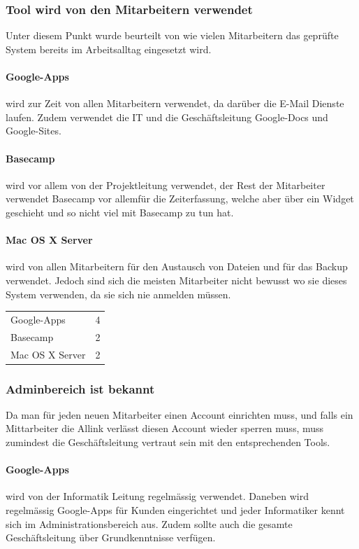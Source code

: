 \subsubsection{Tool wird von den Mitarbeitern verwendet}
\label{ssub:Tool wird von den Mitarbeitern verwendet}
Unter diesem Punkt wurde beurteilt von wie vielen Mitarbeitern das geprüfte
System bereits im Arbeitsalltag eingesetzt wird.
\paragraph{Google-Apps}
\label{par:1.2Google-Apps}
wird zur Zeit von allen Mitarbeitern verwendet, da darüber die E-Mail Dienste
laufen. Zudem verwendet die IT und die Geschäftsleitung Google-Docs und
Google-Sites.
\paragraph{Basecamp}
\label{par:1.2Basecamp}
wird vor allem von der Projektleitung verwendet, der Rest der Mitarbeiter
verwendet Basecamp vor allemfür die Zeiterfassung, welche aber über ein Widget
geschieht und so nicht viel mit Basecamp zu tun hat.
\paragraph{Mac OS X Server}
\label{par:1.2Mac OS X Server}
wird von allen Mitarbeitern für den Austausch von Dateien und für das Backup 
verwendet. Jedoch sind sich die meisten Mitarbeiter nicht bewusst wo sie dieses
System verwenden, da sie sich nie anmelden müssen.

\begin{tabular}{lc}
Google-Apps & 4\\
Basecamp & 2\\
Mac OS X Server & 2\\
\end{tabular}

\subsubsection{Adminbereich ist bekannt}
\label{ssub:Adminbereich ist bekannt}
Da man für jeden neuen Mitarbeiter einen Account einrichten muss, und falls ein
Mittarbeiter die Allink verlässt diesen Account wieder sperren muss, muss
zumindest die Geschäftsleitung vertraut sein mit den entsprechenden Tools.
\paragraph{Google-Apps}
\label{par:1.3Google-Apps}
wird von der Informatik Leitung regelmässig verwendet. Daneben wird regelmässig
Google-Apps für Kunden eingerichtet und jeder Informatiker kennt sich im
Administrationsbereich aus. Zudem sollte auch die gesamte Geschäftsleitung über
Grundkenntnisse verfügen.
